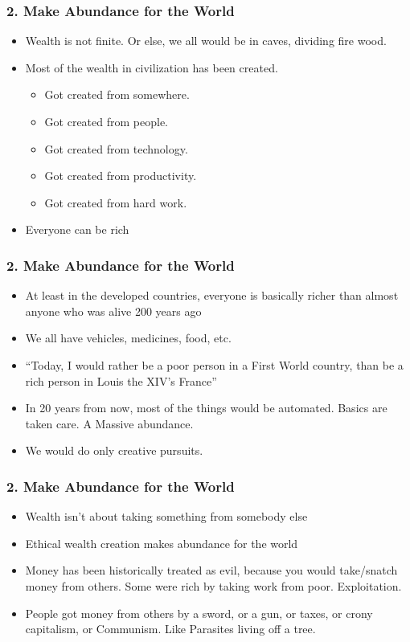 \begin{frame}[fragile]
\frametitle{2. Make Abundance for the World}
\begin{itemize}
\item Wealth is not finite. Or else, we all would be in caves, dividing fire wood.
\item Most of the wealth in civilization has been created.
\begin{itemize}
\item Got created from somewhere. 
\item Got created from people. 
\item Got created from technology. 
\item Got created from productivity. 
\item Got created from hard work.
\end{itemize}
\item Everyone can be rich
\end{itemize}
\end{frame}

\begin{frame}[fragile]
\frametitle{2. Make Abundance for the World}
\begin{itemize}
\item At least in the developed countries, everyone is basically richer than almost anyone who was alive 200 years ago
\item We all have vehicles, medicines, food, etc.
\item ``Today, I would rather be a poor person in a First World country, than be a rich person in Louis the XIV's France''
\item In 20 years from now, most of the things would be automated. Basics are taken care. A Massive abundance.
\item We would do only creative pursuits.
\end{itemize}


\end{frame}


\begin{frame}[fragile]
\frametitle{2. Make Abundance for the World}
\begin{itemize}
\item Wealth isn’t about taking something from somebody else
\item Ethical wealth creation makes abundance for the world
\item Money has been historically treated as evil, because you would take/snatch money from others. Some were rich by taking work from poor. Exploitation. 
\item People got money from others by a sword, or a gun, or taxes, or crony capitalism, or Communism. Like Parasites living off a tree.
\end{itemize}


\end{frame}

